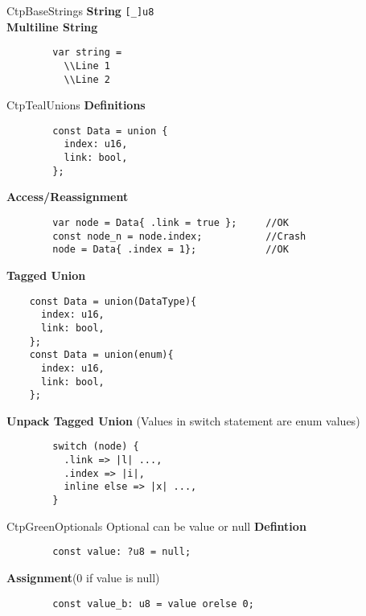 \documentclass[10pt,a4paper]{article}
\begin{document}
\begin{multicols*}{3}
\begin{mycolorbox}{CtpBase}{Strings}
	\textbf{String} \texttt{[_]u8}\\
	\textbf{Multiline String} \begin{verbatim}
		var string = 
		  \\Line 1
		  \\Line 2
	\end{verbatim}
\end{mycolorbox}

\begin{mycolorbox}{CtpTeal}{Unions}
	\textbf{Definitions}
	\begin{verbatim}
		const Data = union {
		  index: u16,
		  link: bool,
		};
	\end{verbatim}

	\textbf{Access/Reassignment}
	\begin{verbatim}
		var node = Data{ .link = true };     //OK
		const node_n = node.index;           //Crash
		node = Data{ .index = 1};            //OK
	\end{verbatim}

		\textbf{Tagged Union}
	\begin{verbatim}
	const Data = union(DataType){
	  index: u16,
	  link: bool,
	};
	const Data = union(enum){
	  index: u16,
	  link: bool,
	};
	\end{verbatim}

		\textbf{Unpack Tagged Union} (Values in switch statement are enum values)
	\begin{verbatim}
		switch (node) {
		  .link => |l| ...,
		  .index => |i|,
		  inline else => |x| ...,
		}
	\end{verbatim}
\end{mycolorbox}


\begin{mycolorbox}{CtpGreen}{Optionals}
	Optional can be value or null
	\textbf{Defintion}
	\begin{verbatim}
		const value: ?u8 = null;
	\end{verbatim}

	\textbf{Assignment}(0 if value is null)
	\begin{verbatim}
		const value_b: u8 = value orelse 0;
	\end{verbatim}
	

\end{mycolorbox}
\end{multicols*}
\end{document}
